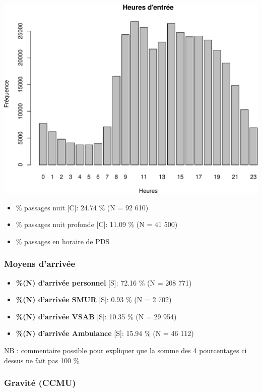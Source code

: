 \documentclass[]{article}
\begin{document}
\includegraphics{rapport2014_V4_files/figure-latex/horaires-1.pdf}

\begin{itemize}
\itemsep1pt\parskip0pt
\item
  \% passages nuit {[}C{]}: 24.74 \% (N = 92 610)
\item
  \% passages nuit profonde {[}C{]}: 11.09 \% (N = 41 500)
\item
  \% passages en horaire de PDS
\end{itemize}

\subsubsection{Moyens d'arrivée}\label{moyens-darrivee}

\begin{itemize}
\itemsep1pt\parskip0pt
\item
  \textbf{\%(N) d'arrivée personnel} {[}S{]}: 72.16 \% (N = 208 771)
\item
  \textbf{\%(N) d'arrivée SMUR} {[}S{]}: 0.93 \% (N = 2 702)
\item
  \textbf{\%(N) d'arrivée VSAB} {[}S{]}: 10.35 \% (N = 29 954)
\item
  \textbf{\%(N) d'arrivée Ambulance} {[}S{]}: 15.94 \% (N = 46 112)
\end{itemize}

NB : commentaire possible pour expliquer que la somme des 4 pourcentages
ci dessus ne fait pas 100 \%

\subsubsection{Gravité (CCMU)}\label{gravite-ccmu}
\end{document}
